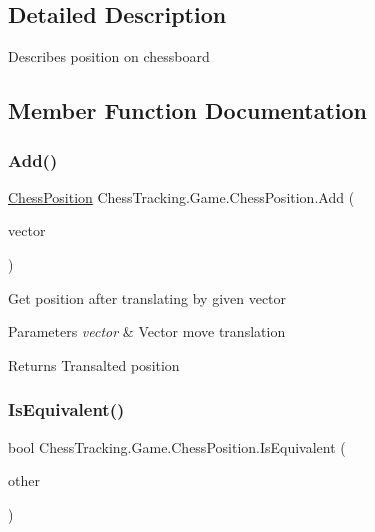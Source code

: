 \subsection{Detailed Description}
Describes position on chessboard 



\subsection{Member Function Documentation}
\mbox{\label{class_chess_tracking_1_1_game_1_1_chess_position_acb0c72210d03873bf923d1b871e31b4b}} 
\subsubsection{\texorpdfstring{Add()}{Add()}}
{\footnotesize\ttfamily \mbox{\hyperlink{class_chess_tracking_1_1_game_1_1_chess_position}{Chess\+Position}} Chess\+Tracking.\+Game.\+Chess\+Position.\+Add (\begin{DoxyParamCaption}\item[{\mbox{\hyperlink{class_chess_tracking_1_1_game_1_1_game_move_vector}{Game\+Move\+Vector}}}]{vector }\end{DoxyParamCaption})}



Get position after translating by given vector 


\begin{DoxyParams}{Parameters}
{\em vector} & Vector move translation\\
\hline
\end{DoxyParams}
\begin{DoxyReturn}{Returns}
Transalted position
\end{DoxyReturn}
\mbox{\label{class_chess_tracking_1_1_game_1_1_chess_position_adf336b10f5e5943de1423fd93517cf48}} 
\subsubsection{\texorpdfstring{IsEquivalent()}{IsEquivalent()}\hspace{0.1cm}{\footnotesize\ttfamily [1/2]}}
{\footnotesize\ttfamily bool Chess\+Tracking.\+Game.\+Chess\+Position.\+Is\+Equivalent (\begin{DoxyParamCaption}\item[{\mbox{\hyperlink{class_chess_tracking_1_1_game_1_1_chess_position}{Chess\+Position}}}]{other }\end{DoxyParamCaption})}



